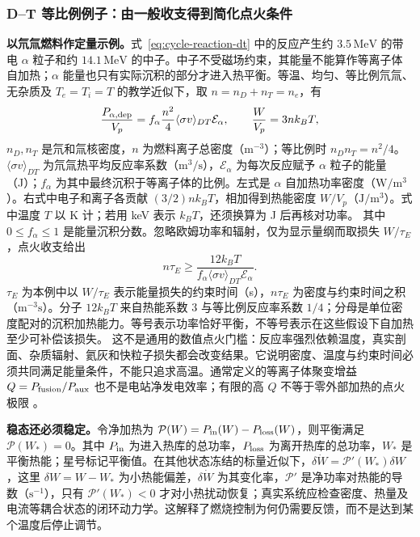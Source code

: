 \documentclass[12pt,fontset=none]{ctexart}
\numberwithin{equation}{section}
\numberwithin{table}{section}
\numberwithin{figure}{section}
\begin{document}
\subsubsection{D--T 等比例例子：由一般收支得到简化点火条件}

\textbf{以氘氚燃料作定量示例。}式~\eqref{eq:cycle-reaction-dt} 中的反应产生约 $3.5\,\mathrm{MeV}$ 的带电 $\alpha$ 粒子和约 $14.1\,\mathrm{MeV}$ 的中子。中子不受磁场约束，其能量不能算作等离子体自加热；$\alpha$ 能量也只有实际沉积的部分才进入热平衡。等温、均匀、等比例氘氚、无杂质及 $T_e=T_i=T$ 的教学近似下，取 $n=n_D+n_T=n_e$，有
\begin{equation}\label{eq:cycle-alpha}
 \frac{P_{\alpha,\rm dep}}{V_p}
 =f_\alpha\frac{n^2}{4}\langle\sigma v\rangle_{DT}\mathcal E_\alpha,
 \qquad \frac{W}{V_p}=3nk_BT,
\end{equation}
$n_D,n_T$ 是氘和氚核密度，$n$ 为燃料离子总密度（$\mathrm{m^{-3}}$）；等比例时 $n_Dn_T=n^2/4$。$\langle\sigma v\rangle_{DT}$ 为氘氚热平均反应率系数（$\mathrm{m^3/s}$），$\mathcal E_\alpha$ 为每次反应赋予 $\alpha$ 粒子的能量（J）；$f_\alpha$ 为其中最终沉积于等离子体的比例。左式是 $\alpha$ 自加热功率密度（$\mathrm{W/m^3}$）。右式中电子和离子各贡献 $(3/2)nk_BT$，相加得到热能密度 $W/V_p$（$\mathrm{J/m^3}$）。式中温度 $T$ 以 K 计；若用 keV 表示 $k_BT$，还须换算为 J 后再核对功率。
其中 $0\leq f_\alpha\leq1$ 是能量沉积分数。忽略欧姆功率和辐射，仅为显示量纲而取损失 $W/\tau_E$，点火收支给出
\begin{equation}\label{eq:cycle-lawson}
 n\tau_E\geq\frac{12k_BT}{f_\alpha\langle\sigma v\rangle_{DT}\mathcal E_\alpha}.
\end{equation}
$\tau_E$ 为本例中以 $W/\tau_E$ 表示能量损失的约束时间（s），$n\tau_E$ 为密度与约束时间之积（$\mathrm{m^{-3}s}$）。分子 $12k_BT$ 来自热能系数 3 与等比例反应率系数 $1/4$；分母是单位密度配对的沉积加热能力。等号表示功率恰好平衡，不等号表示在这些假设下自加热至少可补偿该损失。
这不是通用的数值点火门槛：反应率强烈依赖温度，真实剖面、杂质辐射、氦灰和快粒子损失都会改变结果。它说明密度、温度与约束时间必须共同满足能量条件，不能只追求高温。通常定义的等离子体聚变增益 $Q=P_{\rm fusion}/P_{\rm aux}$ 也不是电站净发电效率；有限的高 $Q$ 不等于零外部加热的点火极限 \cite{C1}。

\textbf{稳态还必须稳定。}令净加热为 $\mathcal P(W)=P_{\rm in}(W)-P_{\rm loss}(W)$，则平衡满足 $\mathcal P(W_*)=0$。其中 $P_{\rm in}$ 为进入热库的总功率，$P_{\rm loss}$ 为离开热库的总功率，$W_*$ 是平衡热能；星号标记平衡值。在其他状态冻结的标量近似下，$\delta\dot W=\mathcal P'(W_*)\delta W$，这里 $\delta W=W-W_*$ 为小热能偏差，$\delta\dot W$ 为其变化率，$\mathcal P'$ 是净功率对热能的导数（$\mathrm{s^{-1}}$），只有 $\mathcal P'(W_*)<0$ 才对小热扰动恢复；真实系统应检查密度、热量及电流等耦合状态的闭环动力学。这解释了燃烧控制为何仍需要反馈，而不是达到某个温度后停止调节。
\end{document}
